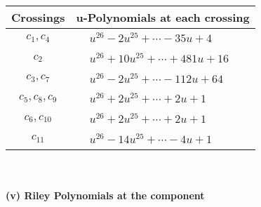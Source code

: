 \documentclass[1p]{elsarticle_modified}
\theoremstyle{definition}
\begin{document}
\begin{tabular}{m{50pt}|m{274pt}}
Crossings & \hspace{64pt}u-Polynomials at each crossing \\
\hline $$\begin{aligned}c_{1},c_{4}\end{aligned}$$&$\begin{aligned}
&u^{26}-2 u^{25}+\cdots-35 u+4
\end{aligned}$\\
\hline $$\begin{aligned}c_{2}\end{aligned}$$&$\begin{aligned}
&u^{26}+10 u^{25}+\cdots+481 u+16
\end{aligned}$\\
\hline $$\begin{aligned}c_{3},c_{7}\end{aligned}$$&$\begin{aligned}
&u^{26}-2 u^{25}+\cdots-112 u+64
\end{aligned}$\\
\hline $$\begin{aligned}c_{5},c_{8},c_{9}\end{aligned}$$&$\begin{aligned}
&u^{26}+2 u^{25}+\cdots+2 u+1
\end{aligned}$\\
\hline $$\begin{aligned}c_{6},c_{10}\end{aligned}$$&$\begin{aligned}
&u^{26}+2 u^{25}+\cdots+2 u+1
\end{aligned}$\\
\hline $$\begin{aligned}c_{11}\end{aligned}$$&$\begin{aligned}
&u^{26}-14 u^{25}+\cdots-4 u+1
\end{aligned}$\\
\hline
\end{tabular}\\~\\
\newpage\renewcommand{\arraystretch}{1}
\flushleft \textbf{(v) Riley Polynomials at the component}\newline \\
\end{document}
